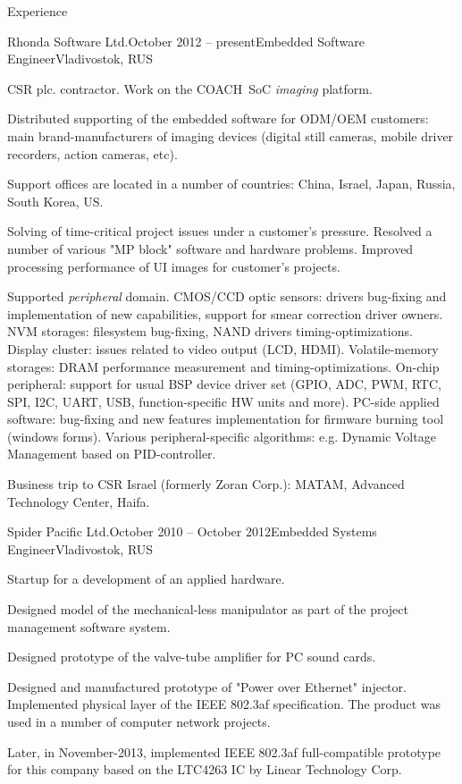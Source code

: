 \documentclass{template}
\begin{document}
\begin{rSection}{Experience}

\begin{rCompany}{Rhonda Software Ltd.}{October 2012 -- present}{Embedded Software Engineer}{Vladivostok, RUS}
\item CSR plc. contractor. Work on the COACH\texttrademark \ SoC \textit{imaging} platform.
\item Distributed supporting of the embedded software for ODM/OEM customers: main brand-manufacturers of imaging devices (digital still cameras, mobile driver recorders, action cameras, etc).
\item Support offices are located in a number of countries: China, Israel, Japan, Russia, South Korea, US.
\item Solving of time-critical project issues under a customer's pressure. Resolved a number of various "MP block" software and hardware problems. Improved processing performance of UI images for customer's projects.
\item Supported \textit{peripheral} domain. CMOS/CCD optic sensors: drivers bug-fixing and implementation of new capabilities, support for smear correction driver owners. NVM storages: filesystem bug-fixing, NAND drivers timing-optimizations. Display cluster: issues related to video output (LCD, HDMI). Volatile-memory storages: DRAM performance measurement and timing-optimizations. On-chip peripheral: support for usual BSP device driver set (GPIO, ADC, PWM, RTC, SPI, I2C, UART, USB, function-specific HW units and more). PC-side applied software: bug-fixing and new features implementation for firmware burning tool (windows forms). Various peripheral-specific algorithms: e.g. Dynamic Voltage Management based on PID-controller.
\item Business trip to CSR Israel (formerly Zoran Corp.): MATAM, Advanced Technology Center, Haifa.
\end{rCompany}

\begin{rCompany}{Spider Pacific Ltd.}{October 2010 -- October 2012}{Embedded Systems Engineer}{Vladivostok, RUS}
\item Startup for a development of an applied hardware.
\item Designed model of the mechanical-less manipulator as part of the project management software system.
\item Designed prototype of the valve-tube amplifier for PC sound cards.
\item Designed and manufactured prototype of "Power over Ethernet" injector. Implemented physical layer of the IEEE 802.3af specification. The product was used in a number of computer network projects.
\item Later, in November-2013, implemented IEEE 802.3af full-compatible prototype for this company based on the LTC4263 IC by Linear Technology Corp.
\end{rCompany}

\end{rSection}
\end{document}
